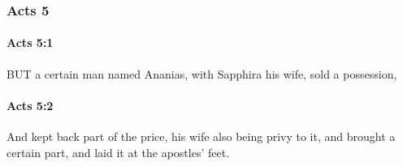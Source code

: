 	\subsubsection{Acts 5} %
		\label{ACTS-5}
		
		\paragraph{Acts 5:1} %
			\label{ACTS-5-1}

			BUT a certain man named Ananias, with Sapphira his wife, sold a possession,

			\begin{framed}
			\scriptsize
				\begin{compactdesc}
					\item[SBLG] 
				\end{compactdesc}
			\end{framed}

		\paragraph{Acts 5:2} %
			\label{ACTS-5-2}

			And kept back part of the price, his wife also being privy to it, and brought a certain part, and laid it at the apostles' feet.

